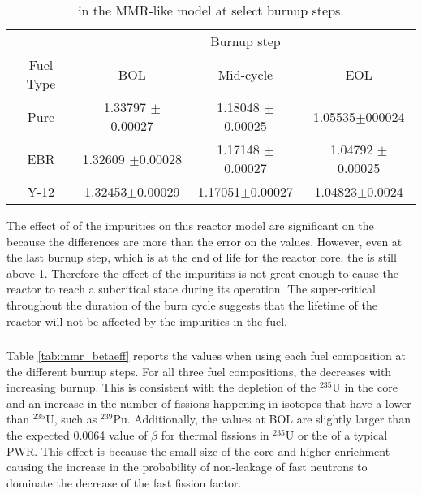 \begin{table}[ht]
        \centering
        \caption{\keff in the \gls{MMR}-like model at select burnup 
        steps.}
        \label{tab:mmr_keff}
        \begin{tabular}{c c c c}
                \hline 
                & \multicolumn{3}{c}{Burnup step}\\
                Fuel Type & \gls{BOL} & Mid-cycle & \gls{EOL} \\
                \hline 
                Pure & 1.33797 $\pm$ 0.00027 & 1.18048 $\pm$ 0.00025 & 1.05535$\pm$000024\\
                \gls{EBR} & 1.32609 $\pm$0.00028 & 1.17148 $\pm$ 0.00027 & 1.04792 $\pm$ 0.00025 \\
                Y-12 & 1.32453$\pm$0.00029 & 1.17051$\pm$0.00027 & 1.04823$\pm$0.0024\\
                \hline
                
        \end{tabular}
\end{table}

 

The effect of of the impurities on this reactor model are significant on the 
\keff because the differences are more than the error on the values. However, 
even at the last burnup step, which is at the end of life for the reactor 
core, the \keff is still above 1. Therefore the effect of the impurities 
is not great enough to cause the reactor to reach a subcritical state 
during its operation. The super-critical \keff throughout the duration 
of the burn cycle suggests that the lifetime of the reactor will not be 
affected by the impurities in the fuel.

\subsubsection{\betaEff}

Table \ref{tab:mmr_betaeff} reports the \betaEff values when using 
each fuel composition at the different burnup steps. For all three 
fuel compositions, the \betaEff decreases with increasing burnup. This 
is consistent with the depletion of the $^{235}$U in the core and 
an increase in the number of fissions happening in isotopes
that have a lower \betaEff than $^{235}$U, such as $^{239}$Pu. 
Additionally, the \betaEff values at \gls{BOL} are slightly larger 
than the expected 0.0064 value of $\beta$ for thermal fissions in $^{235}$U
or the \betaEff of a typical \gls{PWR}. This effect is because the 
small size of the core and higher enrichment causing the 
increase in the probability of non-leakage of fast neutrons to 
dominate the decrease of the fast fission factor. 

